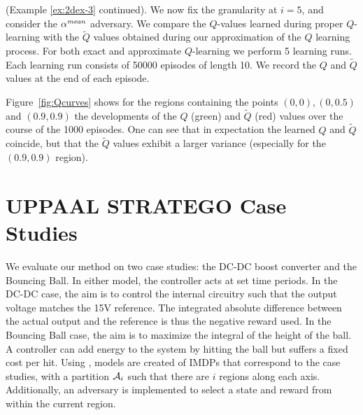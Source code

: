 \documentclass{llncs}
\begin{document}
\begin{example}
\label{ex:2dex-4}
(Example \ref{ex:2dex-3} continued). We now fix the granularity at $i=5$, and 
consider the $\alpha^{\emph{mean}}$ adversary.  We compare the $Q$-values learned during proper $Q$-learning with
the $\tilde{Q}$ values obtained during our approximation of the $Q$ learning process. 
For both exact and approximate $Q$-learning we perform 5 learning
runs. Each learning run consists of 50000 episodes of length 10.
We record the $Q$ and $\tilde{Q}$ values
at the end of each episode. 

Figure~\ref{fig:Qcurves} shows for the regions containing the points $(0,0), (0,0.5)$ and $(0.9,0.9)$
the developments of the
$Q$ (green) and $\tilde{Q}$ (red) values over the course of the 1000 episodes. One can see that in expectation
the learned $Q$ and $\tilde{Q}$ coincide, but that the  $\tilde{Q}$ values exhibit a larger variance (especially
for the $(0.9,0.9)$ region). 
\end{example}



\section{U{\small{PPAAL}} S{\small{TRATEGO}} Case Studies}
We evaluate our method on two case studies: the DC-DC boost converter\cite{dcdcconverter}
and the Bouncing Ball\cite{playball}.
In either model, the controller acts at set time periods.
In the DC-DC case, the aim is to control the internal circuitry such that the output voltage matches the 15V reference.
The integrated absolute difference between the actual output and the reference is thus the negative reward used.
%
In the Bouncing Ball case, the aim is to maximize the integral of the height of the ball.
A controller can add energy to the system by hitting the ball but suffers a fixed cost per hit.
Using \uppaalstratego, models are created of IMDPs that correspond to the case studies,
with a partition $\mathcal{A}_i$ such that there are $i$ regions along each axis. %
Additionally, an adversary is implemented to select a state and reward from within the current region.
\end{document}
